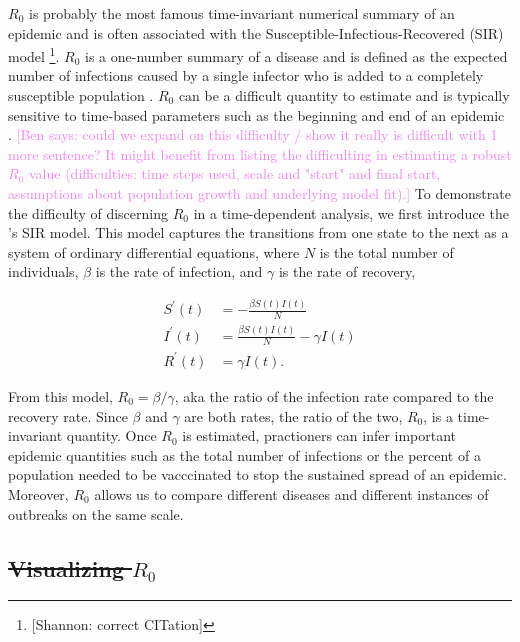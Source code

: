 \documentclass[
  shortnames]{jss}
\begin{document}
\(R_0\) is probably the most famous time-invariant numerical summary of
an epidemic and is often associated with the
Susceptible-Infectious-Recovered (SIR) model
\citep{hethcote2001}\footnote{[Shannon: correct CITation]}. \(R_0\) is a
one-number summary of a disease and is defined as the expected number of
infections caused by a single infector who is added to a completely
susceptible population \citep{anderson1992}. \(R_0\) can be a difficult
quantity to estimate and is typically sensitive to time-based parameters
such as the beginning and end of an epidemic \citep{Gallagher2020}.
\textcolor{violet}{[Ben says: \@Shannon could we expand on this difficulty / show it really is difficult with 1 more sentence? It might benefit from listing the difficulting in estimating a robust $R_0$ value (difficulties: time steps used, scale and "start" and final start, assumptions about population growth and underlying model fit).]}
To demonstrate the difficulty of discerning \(R_0\) in a time-dependent
analysis, we first introduce the \citet{Kermack1927}'s SIR model. This
model captures the transitions from one state to the next as a system of
ordinary differential equations, where \(N\) is the total number of
individuals, \(\beta\) is the rate of infection, and \(\gamma\) is the
rate of recovery,

\begin{align}\label{eq:sir-ode}
    S^\prime(t) &= -\frac{\beta S(t)I(t)}{N} \\
    I^\prime(t) &= \frac{\beta S(t)I(t)}{N} - \gamma I(t) \nonumber\\
    R^\prime(t) &= \gamma I(t) \nonumber.
\end{align}

From this model, \(R_0 = \beta/\gamma\), aka the ratio of the infection
rate compared to the recovery rate. Since \(\beta\) and \(\gamma\) are
both rates, the ratio of the two, \(R_0\), is a time-invariant quantity.
Once \(R_0\) is estimated, practioners can infer important epidemic
quantities such as the total number of infections or the percent of a
population needed to be vacccinated to stop the sustained spread of an
epidemic. Moreover, \(R_0\) allows us to compare different diseases and
different instances of outbreaks on the same scale.

\subsection[visualizing r0]{\sout{ Visualizing $R_0$}}\label{vis-r0}
\end{document}
